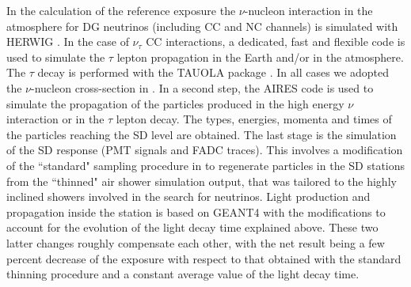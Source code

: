 \documentclass[reprint,showpacs,showkeys,amsmath,amssymb,aps,nofootinbib]{revtex4-1}
\begin{document}
In the calculation of the reference exposure 
the $\nu$-nucleon interaction in the atmosphere for DG neutrinos (including
CC and NC channels) is simulated with HERWIG \cite{HERWIG}.
In the case of $\nu_\tau$ CC interactions, a dedicated, fast and flexible
code is used to simulate the $\tau$ lepton propagation in the Earth and/or
in the atmosphere. The $\tau$ decay is performed with the TAUOLA package \cite{TAUOLA}.
In all cases we adopted the $\nu$-nucleon cross-section in \cite{Cooper-Sarkar}.
In a second step, the AIRES code \cite{AIRES} is used to simulate the propagation of the
particles produced in the high energy $\nu$ interaction or in the $\tau$ lepton decay.
The types, energies, momenta and times of the particles reaching the SD level are obtained.
The last stage is the simulation of the SD response (PMT signals and FADC traces).
This involves a modification of the ``standard" sampling procedure in 
\cite{Billoir_unthinning} to regenerate 
particles in the SD stations from the ``thinned" air shower simulation output, 
that was tailored to the
highly inclined showers involved in the search for neutrinos.   
Light production and propagation inside the station is based on GEANT4 \cite{GEANT4}
with the modifications to account for the evolution of the light decay time explained above.
These two latter changes roughly compensate each other, with the net result
being a few percent decrease of the exposure with respect to that obtained
with the standard thinning procedure and a constant average value of 
the light decay time.
\end{document}
